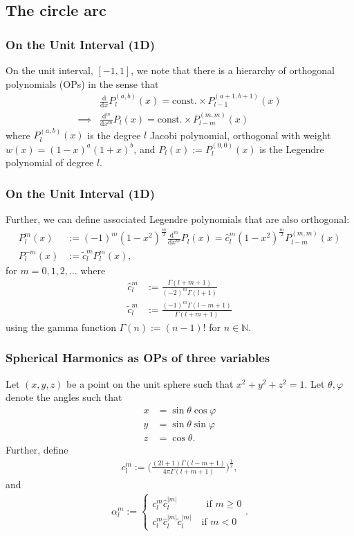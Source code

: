 \documentclass[10pt]{beamer}
\newcommand{\N}{\mathbb{N}}
\newcommand{\Plm}{P^m_l}
\newcommand{\costheta}{\cos\theta}
\newcommand{\sintheta}{\sin\theta}
\newcommand{\cosphi}{\cos\varphi}
\newcommand{\sinphi}{\sin\varphi}
\newcommand{\alphalm}{\alpha^m_l}
\newcommand{\clm}{c^m_l}
\newcommand{\ctilde}{\tilde{c}^m_l}
\newcommand{\ctildemod}{\tilde{c}^{|m|}_l}
\newcommand{\chat}{\hat{c}^m_l}
\newcommand{\chatmod}{\hat{c}^{|m|}_l}
\newcommand{\ddx}{\frac{\mathrm{d}}{\mathrm{d}x}}
\newcommand{\dmdxm}{\frac{\mathrm{d}^m}{\mathrm{d}x^m}}
\begin{document}
\subsection{The circle arc}


\frame
{
  \frametitle{On the Unit Interval (1D)}

On the unit interval, \([-1,1]\), we note that there is a hierarchy of orthogonal polynomials (OPs) in the sense that
\begin{align}
& \ddx P^{(a,b)}_l (x) = \text{const.} \times P^{(a+1,b+1)}_{l-1}(x) \\
\implies & \dmdxm P_l(x) = \text{const.} \times P^{(m,m)}_{l-m}(x)
\end{align}
where \(P^{(a,b)}_l (x)\) is the degree \(l\) Jacobi polynomial, orthogonal with weight \(w(x) = (1-x)^a(1+x)^b\), and \(P_l(x) := P^{(0,0)}_l (x)\) is the Legendre polynomial of degree \(l\).

}

\frame
{
  \frametitle{On the Unit Interval (1D)}

Further, we can define associated Legendre polynomials that are also orthogonal:
\begin{align}
\Plm(x) &:= (-1)^m (1-x^2)^\frac{m}{2} \dmdxm P_l(x) = \chat (1-x^2)^\frac{m}{2} P^{(m,m)}_{l-m}(x) \\
P^{-m}_l(x) &:= \ctilde \Plm(x),
\end{align}
for \(m = 0,1,2,\ldots\) where
\begin{align}
\chat &:= \frac{\Gamma(l+m+1)}{(-2)^m\Gamma(l+1)} \\
\ctilde &:= \frac{(-1)^m\Gamma(l-m+1)}{\Gamma(l+m+1)}
\end{align}
using the gamma function \(\Gamma(n) := (n-1)!\) for \(n \in \N\).

}

\frame
{
    \frametitle{Spherical Harmonics as OPs of three variables}

Let \((x,y,z)\) be a point on the unit sphere such that \(x^2+y^2+z^2 = 1\). Let \(\theta, \varphi\) denote the angles such that
\begin{align}
x &= \sintheta \cosphi \\
y &= \sintheta \sinphi \\
z &= \costheta.
\end{align}
Further, define
\begin{align}
\clm := \Bigg(\frac{(2l+1)\Gamma(l-m+1)}{4\pi\Gamma(l+m+1)}\Bigg)^\frac{1}{2},
\end{align}
and
\begin{align}
\alphalm := \begin{cases} 
		\clm \chatmod \quad \quad \quad \text{if } m \ge 0 \\
		\clm \chatmod \ctildemod \quad \text{if } m < 0
	   \end{cases}.
\end{align}

}
\end{document}
